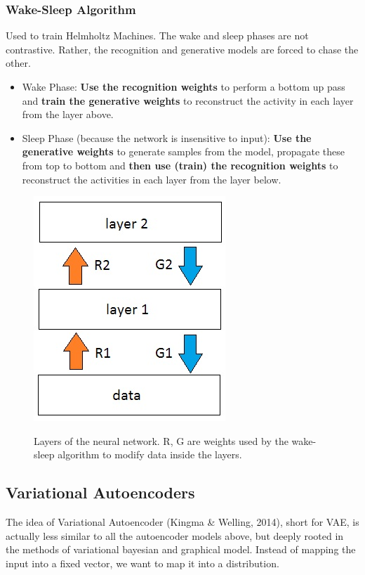 \documentclass[main]{subfiles}
\begin{document}
\subsubsection{Wake-Sleep Algorithm}
Used to train Helmholtz Machines. The wake and sleep phases are not contrastive. Rather, the recognition and generative models are forced to chase the other.

\begin{itemize}
    \item Wake Phase: \textbf{Use the recognition weights} to perform a bottom up pass and \textbf{train the generative weights} to reconstruct the activity in each layer from the layer above.
    \item Sleep Phase (because the network is insensitive to input): \textbf{Use the generative weights} to generate samples from the model, propagate these from top to bottom and \textbf{then use (train) the recognition weights} to reconstruct the activities in each layer from the layer below.
\end{itemize}
 
 \begin{figure}[H]
	\centering
	\includegraphics[width=0.3\linewidth]{07_UnsupervisedAndSelfsupervisedLearning/figures/wake-sleep.jpg}
	\label{fig:wake-sleep}
	\caption{Layers of the neural network. R, G are weights used by the wake-sleep algorithm to modify data inside the layers.}
\end{figure}

\subsection{Variational Autoencoders}
The idea of Variational Autoencoder (Kingma \& Welling, 2014), short for VAE, is actually less similar to all the autoencoder models above, but deeply rooted in the methods of variational bayesian and graphical model. Instead of mapping the input into a fixed vector, we want to map it into a distribution. 
\end{document}
